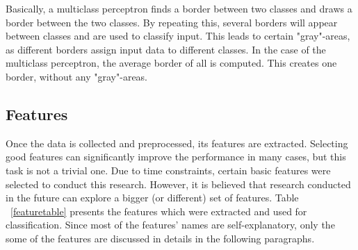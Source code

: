 \documentclass{article} %
\begin{document}
Basically, a multiclass perceptron finds a border between two classes and draws a border between the two classes. By repeating this, several borders will appear between classes and are used to classify input. This leads to certain "gray"-areas, as different borders assign input data to different classes. In the case of the multiclass perceptron, the average border of all is computed. This creates one border, without any "gray"-areas.

\subsection{Features \label{sec:features}}

Once the data is collected and preprocessed, its features are extracted. Selecting good features can significantly improve the performance in many cases, but this task is not a trivial one. Due to time constraints, certain basic features were selected to conduct this research. However, it is believed that research conducted in the future can explore a bigger (or different) set of features. Table ~\ref{featuretable} presents the features which were extracted and used for classification. Since most of the features' names are self-explanatory, only the some of the features are discussed in details in the following paragraphs.


\begin{comment}
\begin{itemize}
\item \textbf{words} - total number of words in the text 
\item \textbf{positive words} - total number of positive words in the text
\item \textbf{negative words} - total number of negative words in the text 
\item \textbf{positive words hashtags} - total number of positive words in the hashtags 
\item \textbf{negative words hashtags} - total number of negative words in the hashtags 
\item \textbf{uppercase words} - number of words containing only uppercase letters 
\item \textbf{special punctuation} - number of special punctuation marks such as `!' and `?' 
\item \textbf{adjectives} - number of adjectives in the text  
\end{itemize}
\end{comment}
\end{document}
